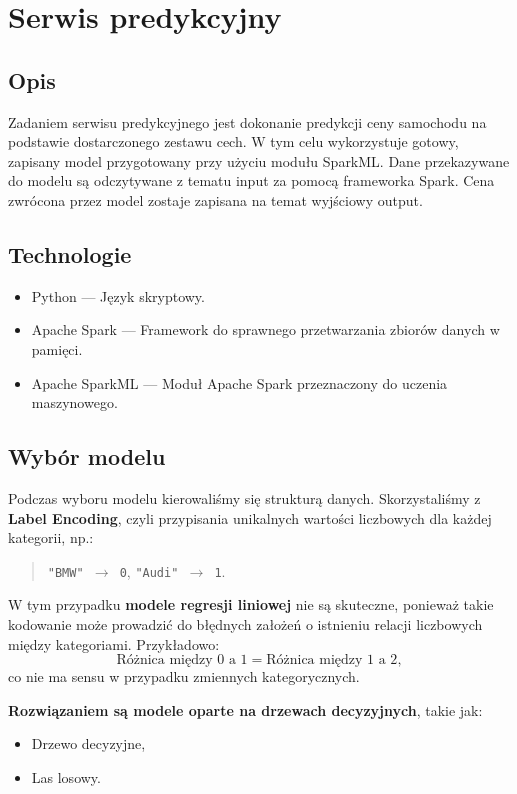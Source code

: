 \documentclass[12pt, a4paper]{report}
\begin{document}
\chapter{Serwis predykcyjny}
\section{Opis}
    Zadaniem serwisu predykcyjnego jest dokonanie predykcji ceny samochodu na podstawie dostarczonego zestawu cech.
    W tym celu wykorzystuje gotowy, zapisany model przygotowany przy użyciu modułu SparkML.\@
    Dane przekazywane do modelu są odczytywane z tematu input za pomocą frameworka Spark. Cena zwrócona przez
    model zostaje zapisana na temat wyjściowy output.
\section{Technologie}
\begin{itemize}
    \item Python --- Język skryptowy. 
    \item Apache Spark --- Framework do sprawnego przetwarzania zbiorów danych w pamięci.
    \item Apache SparkML --- Moduł Apache Spark przeznaczony do uczenia maszynowego.
\end{itemize}

\section{Wybór modelu}

Podczas wyboru modelu kierowaliśmy się strukturą danych. Skorzystaliśmy z \textbf{Label Encoding}, czyli przypisania unikalnych wartości liczbowych dla każdej kategorii, np.:
\begin{quote}
\texttt{"BMW" $\rightarrow$ 0}, \texttt{"Audi" $\rightarrow$ 1}.
\end{quote}

\noindent W tym przypadku \textbf{modele regresji liniowej} nie są skuteczne, ponieważ takie kodowanie może prowadzić do błędnych założeń o istnieniu relacji liczbowych między kategoriami. Przykładowo:
\[
\text{Różnica między 0 a 1} = \text{Różnica między 1 a 2},
\]
co nie ma sensu w przypadku zmiennych kategorycznych.

\noindent \textbf{Rozwiązaniem są modele oparte na drzewach decyzyjnych}, takie jak:
\begin{itemize}
    \item Drzewo decyzyjne,
    \item Las losowy.
\end{itemize}
\end{document}
